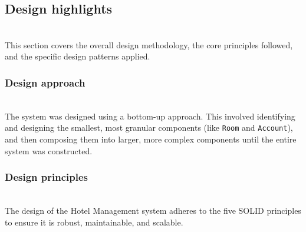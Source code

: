 \subsection{Design highlights}\label{bS_S1dLq6LXPX1z2UtPcX}
\\
This section covers the overall design methodology, the core principles followed, and the specific design patterns applied.

\subsubsection{Design approach}\label{v82OL36pgFyBTBqz6xThh}
\\
The system was designed using a bottom-up approach. This involved identifying and designing the smallest, most granular components (like \texttt{Room} and \texttt{Account}), and then composing them into larger, more complex components until the entire system was constructed.

\subsubsection{Design principles}\label{yTTY1jnckldTdoluLyBiI}
\\
The design of the Hotel Management system adheres to the five SOLID principles to ensure it is robust, maintainable, and scalable.

